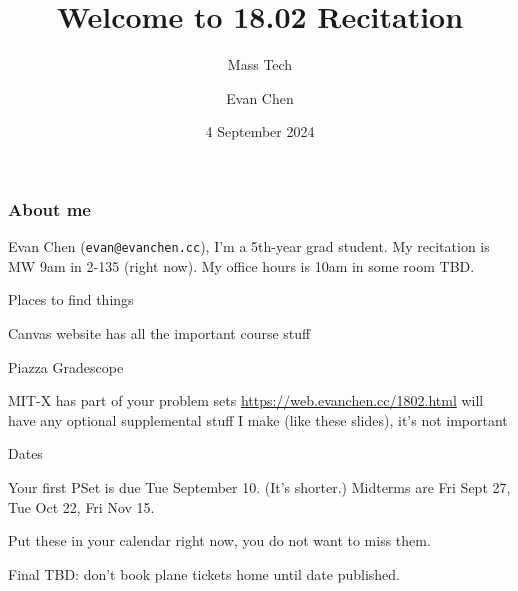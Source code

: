 \documentclass[11pt]{beamer}
\title{Welcome to 18.02 Recitation}
\subtitle{Mass Tech}
\author{Evan Chen}
\date{4 September 2024}
\begin{document}
\begin{frame}
  \maketitle
\end{frame}

\begin{frame}
  \frametitle{About me}
  \begin{itemize}
    \ii Evan Chen (\texttt{evan@evanchen.cc}), I'm a 5th-year grad student.
    \ii My recitation is MW 9am in 2-135 (right now).
    \ii My office hours is 10am in some room TBD.
  \end{itemize}
\end{frame}

\begin{frame}
  \begin{block}{Places to find things}
    \begin{itemize}
      \ii Canvas website has all the important course stuff
      \begin{itemize}
        \ii Piazza
        \ii Gradescope
      \end{itemize}
      \ii MIT-X has part of your problem sets
      \ii \url{https://web.evanchen.cc/1802.html} will have any
      optional supplemental stuff I make (like these slides), it's \alert{not} important
    \end{itemize}
  \end{block}
  \begin{block}{Dates}
    \begin{itemize}
      \ii Your first PSet is due Tue September 10. (It's shorter.)
      \ii Midterms are \alert{Fri Sept 27}, \alert{Tue Oct 22}, \alert{Fri Nov 15}.
      \begin{itemize}
        \ii Put these in your calendar right now, you do not want to miss them.
      \end{itemize}
      \ii Final TBD: don't book plane tickets home until date published.
    \end{itemize}
  \end{block}
\end{frame}
\end{document}

